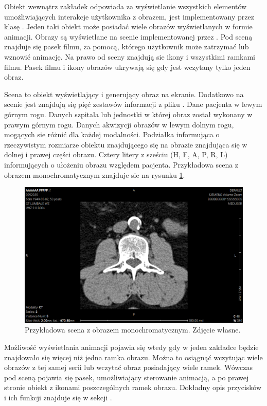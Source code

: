 \par
Obiekt wewnątrz zakładek odpowiada za wyświetlanie wszystkich elementów umożliwiających interakcje użytkownika z obrazem, jest implementowany przez klasę .
Jeden taki obiekt może posiadać wiele obrazów wyświetlanych w formie animacji.
Obrazy są wyświetlane na scenie implementowanej przez .
Pod sceną znajduje się pasek filmu, za pomocą, którego użytkownik może zatrzymać lub wznowić animację.
Na prawo od sceny znajdują sie ikony i wszystkimi ramkami filmu.
Pasek filmu i ikony obrazów ukrywają się gdy jest wczytany tylko jeden obraz.
\par
Scena to obiekt wyświetlający i generujący obraz na ekranie.
Dodatkowo na scenie jest znajdują się pięć zestawów informacji z pliku \DICOM.
Dane pacjenta w lewym górnym rogu.
Danych szpitala lub jednostki w której obraz został wykonany w prawym górnym rogu.
Danych akwizycji obrazów w lewym dolnym rogu, mogących sie różnić dla każdej modalności.
Podziałka informująca o rzeczywistym rozmiarze obiektu znajdującego się na obrazie znajdująca się w dolnej i prawej części obrazu.
Cztery litery z sześciu (H, F, A, P, R, L) informujących o ułożeniu obrazu względem pacjenta.
Przykładowa scena z obrazem monochromatycznym znajduje sie na rysunku \ref{fig:sokar-gui-scene}.

\begin{figure}[!htbp]
    \centering
    \includegraphics[width=\textwidth]{img/sokar-gui-003.png}
    \caption{Przykładowa scena z obrazem monochromatycznym. Zdjęcie własne.}
    \label{fig:sokar-gui-scene}
\end{figure}

\par
Możliwość wyświetlania animacji pojawia się wtedy gdy w jeden zakładce będzie znajdowało się więcej niż jedna ramka obrazu.
Można to osiągnąć wczytując wiele obrazów z tej samej serii lub wczytać obraz posiadający wiele ramek.
Wówczas pod sceną pojawia się pasek, umożliwiający sterowanie animacją, a po prawej stronie obiekt z ikonami poszczególnych ramek obrazu.
Dokładny opis przycisków i ich funkcji znajduje się w sekcji .


